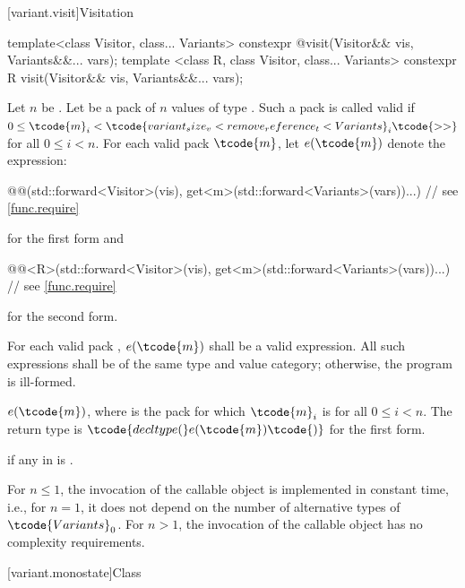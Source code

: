 [variant.visit]{Visitation}

%
%
\begin{itemdecl}
template<class Visitor, class... Variants>
  constexpr @\seebelow@ visit(Visitor&& vis, Variants&&... vars);
template <class R, class Visitor, class... Variants>
  constexpr R visit(Visitor&& vis, Variants&&... vars);
\end{itemdecl}

\begin{itemdescr}
\pnum
Let $n$ be . Let  be a pack of $n$
values of type . Such a pack is called valid if $0 \leq
\tcode{m}_i < \tcode{variant_size_v<remove_reference_t<Variants}_i\tcode{>>}$ for
all $0 \leq i < n$. For each valid pack $\tcode{m}$, let $e(\tcode{m})$
denote the expression:
\begin{codeblock}
@@(std::forward<Visitor>(vis), get<m>(std::forward<Variants>(vars))...) // see \ref{func.require}
\end{codeblock}
for the first form and
\begin{codeblock}
@@<R>(std::forward<Visitor>(vis), get<m>(std::forward<Variants>(vars))...) // see \ref{func.require}
\end{codeblock}
for the second form.

\pnum
\requires
For each valid pack , $e(\tcode{m})$ shall be a valid expression.
All such expressions shall be of the same type and value category;
otherwise, the program is ill-formed.

\pnum
\returns $e(\tcode{m})$, where  is the pack for which
$\tcode{m}_i$ is  for all $0 \leq i < n$.
The return type is $\tcode{decltype(}e(\tcode{m})\tcode{)}$
for the first form.

\pnum
\throws
{} if any  in  is .

\pnum
\complexity
For $n \leq 1$, the invocation of the callable object is
implemented in constant time, i.e., for $n = 1$, it does not depend on
the number of alternative types of $\tcode{Variants}_0$.
For $n > 1$, the invocation of the callable object has
no complexity requirements.
\end{itemdescr}

%
[variant.monostate]{Class }

